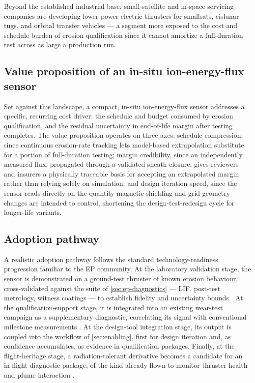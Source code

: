 Beyond the established industrial base, small-satellite and in-space servicing companies are developing lower-power electric thrusters for smallsats, cislunar tugs, and orbital transfer vehicles — a segment more exposed to the cost and schedule burden of erosion qualification since it cannot amortize a full-duration test across as large a production run.

\subsection{Value proposition of an in-situ ion-energy-flux sensor}

Set against this landscape, a compact, in-situ ion-energy-flux sensor addresses a specific, recurring cost driver: the schedule and budget consumed by erosion qualification, and the residual uncertainty in end-of-life margin after testing completes. The value proposition operates on three axes: schedule compression, since continuous erosion-rate tracking lets model-based extrapolation substitute for a portion of full-duration testing; margin credibility, since an independently measured flux, propagated through a validated sheath closure, gives reviewers and insurers a physically traceable basis for accepting an extrapolated margin rather than relying solely on simulation; and design iteration speed, since the sensor reads directly on the quantity magnetic shielding and grid-geometry changes are intended to control, shortening the design-test-redesign cycle for longer-life variants.

\subsection{Adoption pathway}

A realistic adoption pathway follows the standard technology-readiness progression familiar to the EP community. At the laboratory validation stage, the sensor is demonstrated on a ground-test thruster of known erosion behaviour, cross-validated against the suite of \cref{sec:ep-diagnostics} — LIF, post-test metrology, witness coatings — to establish fidelity and uncertainty bounds \cite{ref0454,ref0490}. At the qualification-support stage, it is integrated into an existing wear-test campaign as a supplementary diagnostic, correlating its signal with conventional milestone measurements \cite{ref0490,ref0511}. At the design-tool integration stage, its output is coupled into the workflow of \cref{sec:enabling}, first for design iteration and, as confidence accumulates, as evidence in qualification packages. Finally, at the flight-heritage stage, a radiation-tolerant derivative becomes a candidate for an in-flight diagnostic package, of the kind already flown to monitor thruster health and plume interaction \cite{ref0496}.

